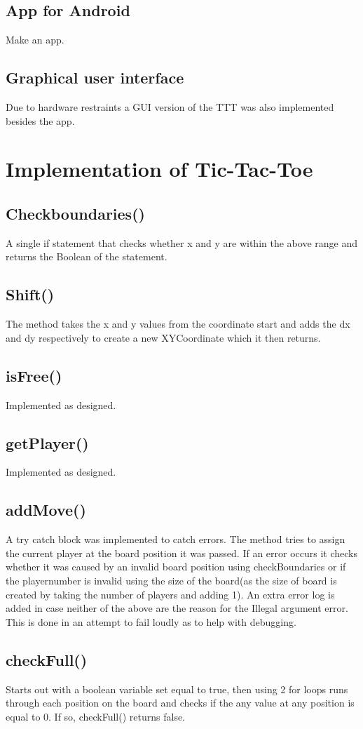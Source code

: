 \documentclass[a4paper,10pt]{article}
\begin{document}
	\subsection{App for Android}
	Make an app.
	\subsection{Graphical user interface}
	Due to hardware restraints a GUI version of the TTT was also implemented besides the app. 
	
	\section{Implementation  of Tic-Tac-Toe}  
	\subsection{Checkboundaries()}
	A single if statement that checks whether x and y are within the above range and returns the Boolean of the statement.
	\subsection{Shift()}
	The method takes the x and y values from the coordinate start and adds the dx and dy respectively to create a new XYCoordinate which it then returns.
	\subsection{isFree()}
	Implemented as designed.
	\subsection{getPlayer()}
	Implemented as designed.
	\subsection{addMove()}
	A try catch block was implemented to catch errors. The method tries to assign the current player at the board position it was passed. If an error occurs it checks whether it was caused by an invalid board position using checkBoundaries or if the playernumber is invalid using the size of the board(as the size of board is created by taking the number of players and adding 1). An extra error log is added in case neither of the above are the reason for the Illegal argument error. This is done in an attempt to fail loudly as to help with debugging.
	\subsection{checkFull()}
	Starts out with a boolean variable set equal to true, then using 2 for loops runs through each position on the board and checks if the any value at any position is equal to 0. If so, checkFull() returns false.
	
\end{document}
